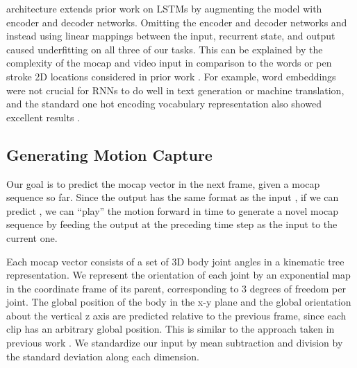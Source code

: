 \documentclass[10pt,twocolumn,letterpaper]{article}
\begin{document}
 
 






















 architecture extends prior work on LSTMs by augmenting the model with encoder and decoder networks.
Omitting the encoder and decoder networks and instead using linear mappings between the input, recurrent state, and output 
caused underfitting on all three of our tasks. 
This can be explained by the complexity of the mocap and video input in comparison to the words or pen stroke 2D  locations considered in prior work \cite{DBLP:journals/corr/Graves13}. For example, word embeddings were not crucial for RNNs to do well in text generation or machine translation, and the standard one hot encoding vocabulary representation also showed excellent results \cite{DBLP:conf/nips/SutskeverVL14}.


\subsection{Generating Motion Capture}


Our goal is to predict the mocap vector in the next frame, given a mocap sequence so far. Since the output  has the same format as  the input , if we can predict , we can ``play'' the motion forward in time to generate a novel mocap sequence by feeding the output at the preceding time step as the input to the current one.







Each mocap  vector consists of a set of 3D body joint angles in a kinematic tree representation. 
We represent the orientation of each joint by an exponential map in the coordinate frame of its parent, corresponding to 3 degrees of freedom per joint. The global position of the body in the x-y plane and the global orientation about the vertical z axis are predicted relative to the previous frame, since each clip has an arbitrary global position. This is similar to the approach taken in previous work \cite{thr-mhmub-06}. We standardize our input by mean subtraction and division by the standard deviation along each dimension. 
\end{document}
